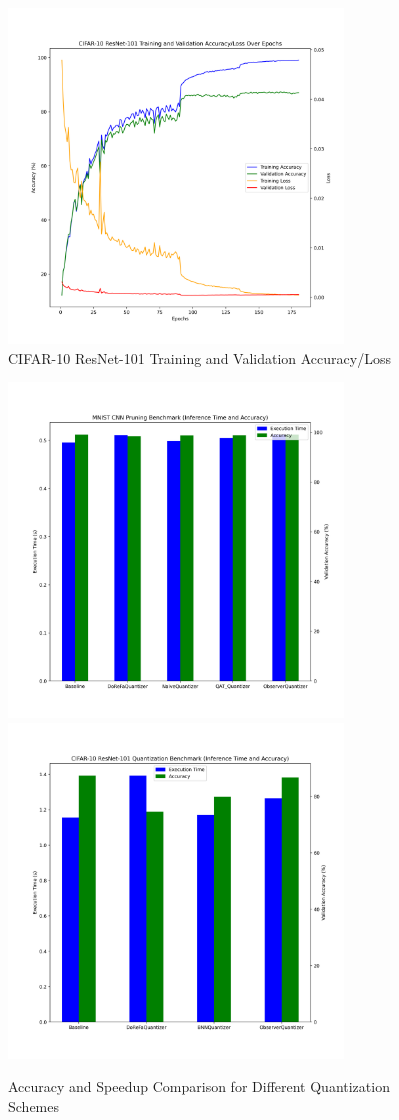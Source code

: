 \documentclass{article}
\begin{document}
\begin{figure}
    \centerline{\includegraphics[width=3.5in]{../proj2/figures/cifar10_baseline.png}}
    \caption{CIFAR-10 ResNet-101 Training and Validation Accuracy/Loss}
    \label{fig:cifar-resnet-nq}
\end{figure}

\begin{figure}
    \centerline{\includegraphics[width=3.5in]{../proj2/figures/mnist_cnn_benchmark.png}\includegraphics[width=3.5in]{../proj2/figures/cifar10_resnet101_benchmark.png}}
    \caption{Accuracy and Speedup Comparison for Different Quantization Schemes}
    \label{fig:quantization-compare}
\end{figure}
\end{document}
